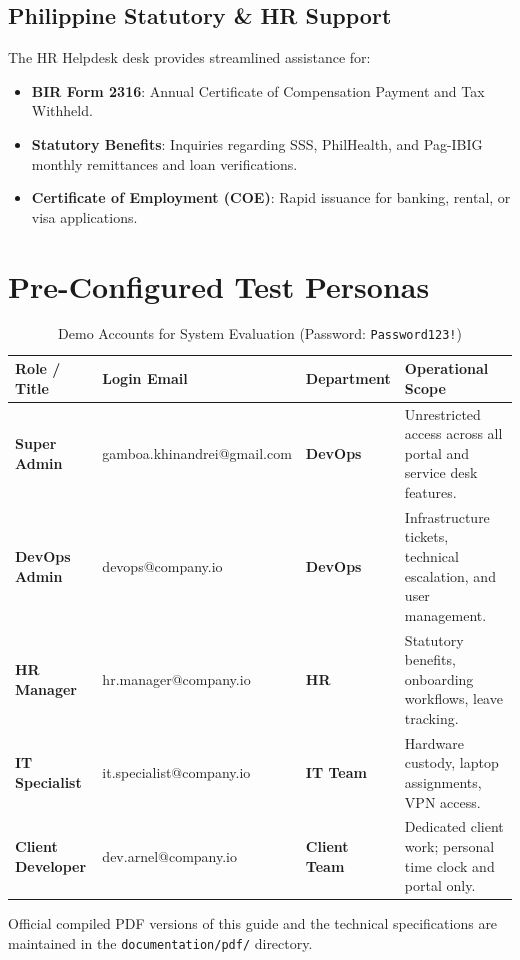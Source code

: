 \documentclass[a4paper,11pt]{article}
\begin{document}
\subsection{Philippine Statutory \& HR Support}
The HR Helpdesk desk provides streamlined assistance for:
\begin{itemize}
    \item \textbf{BIR Form 2316}: Annual Certificate of Compensation Payment and Tax Withheld.
    \item \textbf{Statutory Benefits}: Inquiries regarding SSS, PhilHealth, and Pag-IBIG monthly remittances and loan verifications.
    \item \textbf{Certificate of Employment (COE)}: Rapid issuance for banking, rental, or visa applications.
\end{itemize}

\section{Pre-Configured Test Personas}

\begin{table}[!ht]
\centering
\small
\begin{tabularx}{\textwidth}{>{\bfseries}p{2.6cm} >{\footnotesize\ttfamily}p{4.7cm} >{\bfseries}p{2.2cm} X}
\toprule
Role / Title & Login Email & Department & Operational Scope \\
\midrule
Super Admin & gamboa.khinandrei@gmail.com & DevOps & Unrestricted access across all portal and service desk features. \\
\addlinespace
DevOps Admin & devops@company.io & DevOps & Infrastructure tickets, technical escalation, and user management. \\
\addlinespace
HR Manager & hr.manager@company.io & HR & Statutory benefits, onboarding workflows, leave tracking. \\
\addlinespace
IT Specialist & it.specialist@company.io & IT Team & Hardware custody, laptop assignments, VPN access. \\
\addlinespace
Client Developer & dev.arnel@company.io & Client Team & Dedicated client work; personal time clock and portal only. \\
\bottomrule
\end{tabularx}
\caption{Demo Accounts for System Evaluation (Password: \texttt{Password123!})}
\end{table}

\begin{tipbox}
Official compiled PDF versions of this guide and the technical specifications are maintained in the \texttt{documentation/pdf/} directory.
\end{tipbox}
\end{document}
